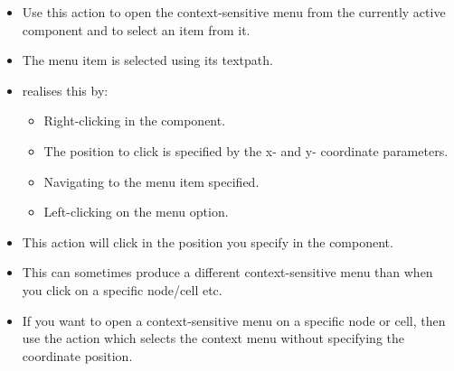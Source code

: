 
\begin{itemize}
\item Use this action to open the context-sensitive menu from the currently active component and to select an item from it.
\item The menu item is selected using its textpath. 
\item \jb{} realises this by:
\begin{itemize}
\item Right-clicking in the component.
\item The position to click is specified by the x- and y- coordinate parameters.
\item Navigating to the menu item specified.
\item Left-clicking on the menu option.  
\end{itemize}
\item This action will click in the position you specify in the component.
\item This can sometimes produce a different context-sensitive menu than when you click on a specific node/cell etc.
\item If you want to open a context-sensitive menu on a specific node or cell, then use the action which selects the context menu without specifying the coordinate position.
\end{itemize}

